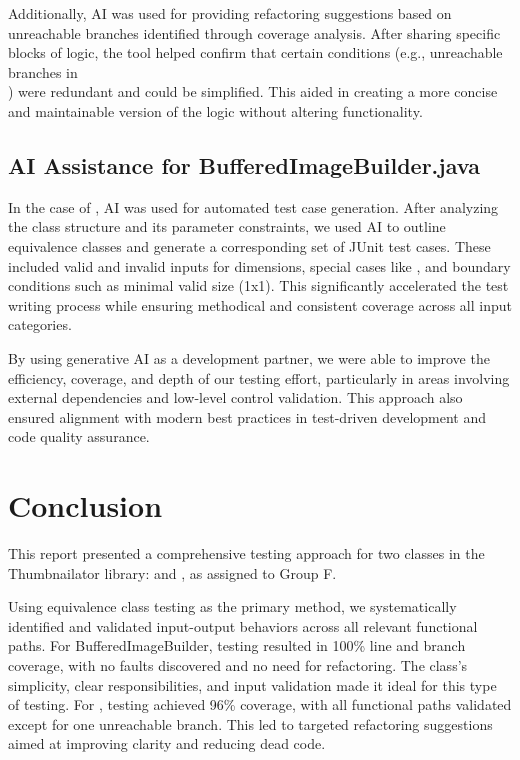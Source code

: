 \documentclass[12pt]{article}
\begin{document}
    Additionally, AI was used for providing refactoring suggestions based on
        unreachable branches identified through coverage analysis.
    After sharing specific blocks of logic, the tool helped confirm that certain
        conditions (e.g., unreachable branches in\\
        ) were redundant and could be
        simplified.
    This aided in creating a more concise and maintainable version of the logic
        without altering functionality.

    \markboth{}{}
    \subsection{AI Assistance for BufferedImageBuilder.java}
    \markboth{}{}

    In the case of , AI was used for automated
        test case generation.
    After analyzing the class structure and its parameter constraints, we used
        AI to outline equivalence classes and generate a corresponding set of
        JUnit test cases.
    These included valid and invalid inputs for dimensions, special cases like
        , and boundary conditions such as minimal valid size
        (1x1).
    This significantly accelerated the test writing process while ensuring
        methodical and consistent coverage across all input categories.

    By using generative AI as a development partner, we were able to improve the
        efficiency, coverage, and depth of our testing effort, particularly in
        areas involving external dependencies and low-level control validation.
    This approach also ensured alignment with modern best practices in
        test-driven development and code quality assurance.

    \section{Conclusion}

    This report presented a comprehensive testing approach for two classes in
        the Thumbnailator library:  and
        , as assigned to Group F.

    Using equivalence class testing as the primary method, we systematically
        identified and validated input-output behaviors across all relevant
        functional paths.
    For BufferedImageBuilder, testing resulted in 100\% line and
        branch coverage, with no faults discovered and no need for refactoring.
    The class's simplicity, clear responsibilities, and input validation made it
        ideal for this type of testing.
    For , testing achieved 96\%
        coverage, with all functional paths validated except for one unreachable
        branch.
    This led to targeted refactoring suggestions aimed at improving clarity and
        reducing dead code.
\end{document}
